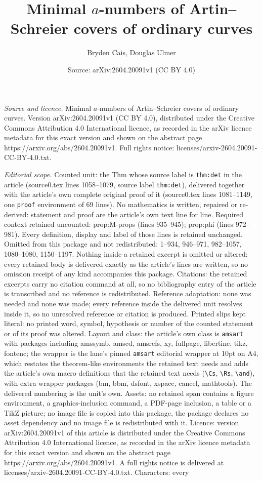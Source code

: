 \documentclass[10pt,a4paper]{amsart}
\title[Minimal $a$-numbers of Artin--Schreier covers of ordinary cu]{Minimal $a$-numbers of Artin--Schreier covers of ordinary curves}
\author{Bryden Cais, Douglas Ulmer}
\date{Source: arXiv:2604.20091v1 (CC BY 4.0)}
\begin{document}
\maketitle

\noindent\emph{Source and licence.} Minimal $a$-numbers of Artin--Schreier covers of ordinary curves. Version arXiv:2604.20091v1 (CC BY 4.0), distributed under the Creative Commons Attribution 4.0 International licence, as recorded in the arXiv licence metadata for this exact version and shown on the abstract page https://arxiv.org/abs/2604.20091v1. Full rights notice: licenses/arxiv-2604.20091-CC-BY-4.0.txt.\par\smallskip

\noindent\textit{Editorial scope.} Counted unit: the Thm whose source label is \texttt{thm:det} in the article (source0.tex lines 1058--1079, source label \texttt{thm:det}), delivered together with the article's own complete original proof of it (source0.tex lines 1081--1149, one \texttt{proof} environment of 69 lines). No mathematics is written, repaired or re-derived: statement and proof are the article's own text line for line. Required context retained uncounted: prop:M-props (lines 935--945); prop:phi (lines 972--981). Every definition, display and label of those lines is retained unchanged. Omitted from this package and not redistributed: 1--934, 946--971, 982--1057, 1080--1080, 1150--1197. Nothing inside a retained excerpt is omitted or altered: every retained body is delivered exactly as the article's lines are written, so no omission receipt of any kind accompanies this package. Citations: the retained excerpts carry no citation command at all, so no bibliography entry of the article is transcribed and no reference is redistributed. Reference adaptation: none was needed and none was made; every reference inside the delivered unit resolves inside it, so no unresolved reference or citation is produced. Printed slips kept literal: no printed word, symbol, hypothesis or number of the counted statement or of its proof was altered. Layout and class: the article's own class is \texttt{amsart} with packages including amssymb, amscd, amsrefs, xy, fullpage, libertine, tikz, fontenc; the wrapper is the lane's pinned \texttt{amsart} editorial wrapper at 10pt on A4, which restates the theorem-like environments the retained text needs and adds the article's own macro definitions that the retained text needs (\texttt{\textbackslash Cs}, \texttt{\textbackslash Rs}, \texttt{\textbackslash and}), with extra wrapper packages (bm, bbm, dsfont, xspace, cancel, mathtools). The delivered numbering is the unit's own. Assets: no retained span contains a figure environment, a graphics-inclusion command, a PDF-page inclusion, a table or a TikZ picture; no image file is copied into this package, the package declares no asset dependency and no image file is redistributed with it. Licence: version arXiv:2604.20091v1 of this article is distributed under the Creative Commons Attribution 4.0 International licence, as recorded in the arXiv licence metadata for this exact version and shown on the abstract page https://arxiv.org/abs/2604.20091v1. A full rights notice is delivered at licenses/arxiv-2604.20091-CC-BY-4.0.txt. Characters: every 
\end{document}
